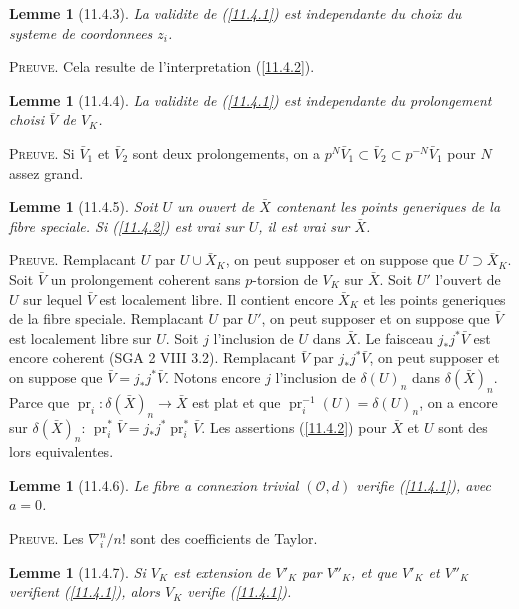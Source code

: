 \documentclass[12pt,a4paper]{article}
\theoremstyle{plain}
\newtheorem{lemma}[theorem]{Lemme}
\theoremstyle{definition}
\theoremstyle{remark}
\DeclareMathOperator{\pr}{pr}
\begin{document}
\begin{lemma}[11.4.3]
La validite de (\ref{11.4.1}) est independante du choix du systeme de coordonnees $z_i$.
\end{lemma}

\textsc{Preuve.} Cela resulte de l'interpretation (\ref{11.4.2}).

\begin{lemma}[11.4.4]
La validite de (\ref{11.4.1}) est independante du prolongement choisi $\bar{V}$ de $V_K$.
\end{lemma}

\textsc{Preuve.} Si $\bar{V}_1$ et $\bar{V}_2$ sont deux prolongements, on a $p^N \bar{V}_1 \subset \bar{V}_2 \subset p^{-N} \bar{V}_1$ pour $N$ assez grand.

\begin{lemma}[11.4.5]
Soit $U$ un ouvert de $\bar{X}$ contenant les points generiques de la fibre speciale. Si (\ref{11.4.2}) est vrai sur $U$, il est vrai sur $\bar{X}$.
\end{lemma}

\textsc{Preuve.} Remplacant $U$ par $U \cup \bar{X}_K$, on peut supposer et on suppose que $U \supset \bar{X}_K$. Soit $\bar{V}$ un prolongement coherent sans $p$-torsion de $V_K$ sur $\bar{X}$. Soit $U'$ l'ouvert de $U$ sur lequel $\bar{V}$ est localement libre. Il contient encore $\bar{X}_K$ et les points generiques de la fibre speciale. Remplacant $U$ par $U'$, on peut supposer et on suppose que $\bar{V}$ est localement libre sur $U$. Soit $j$ l'inclusion de $U$ dans $\bar{X}$. Le faisceau $j_* j^* \bar{V}$ est encore coherent (SGA 2 VIII 3.2). Remplacant $\bar{V}$ par $j_* j^* \bar{V}$, on peut supposer et on suppose que $\bar{V} = j_* j^* \bar{V}$. Notons encore $j$ l'inclusion de $\delta(U)_n$ dans $\delta(\bar{X})_n$. Parce que $\pr_i: \delta(\bar{X})_n \to \bar{X}$ est plat et que $\pr_i^{-1}(U) = \delta(U)_n$, on a encore sur $\delta(\bar{X})_n$: $\pr_i^* \bar{V} = j_* j^* \pr_i^* \bar{V}$. Les assertions (\ref{11.4.2}) pour $\bar{X}$ et $U$ sont des lors equivalentes.

\begin{lemma}[11.4.6]
Le fibre a connexion trivial $(\mathcal{O}, d)$ verifie (\ref{11.4.1}), avec $a = 0$.
\end{lemma}

\textsc{Preuve.} Les $\nabla_i^n/n!$ sont des coefficients de Taylor.

\begin{lemma}[11.4.7]
Si $V_K$ est extension de $V'_K$ par $V''_K$, et que $V'_K$ et $V''_K$ verifient (\ref{11.4.1}), alors $V_K$ verifie (\ref{11.4.1}).
\end{lemma}
\end{document}

